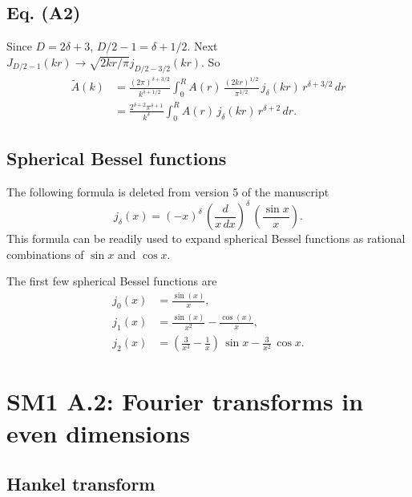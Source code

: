 \documentclass[preprint]{revtex4-1}
\numberwithin{equation}{subsection}
\numberwithin{table}{section}
\begin{document}
\subsection{Eq. (A2)}

Since $D = 2\delta + 3$, $D/2 - 1 = \delta + 1/2$.
%
Next $J_{D/2-1}(kr) \rightarrow \sqrt{2 k r/\pi} j_{D/2-3/2} (kr)$.
%
So
\begin{align*}
\tilde A(k)
&=
\frac{ (2 \pi)^{\delta + 3/2} } { k^{\delta + 1/2} }
\int_0^R
  A(r) \, \frac{ (2kr)^{1/2} } { \pi^{1/2} } \,
  j_\delta(k r) \, r^{\delta + 3/2}\, dr \\
&=
  \frac{ 2^{\delta + 2} \pi^{\delta + 1} } { k^\delta }
\int_0^R
  A(r) \, j_\delta(k r) \, r^{\delta + 2} \, dr.
\end{align*}



\subsection{Spherical Bessel functions}

The following formula is deleted from version 5 of the manuscript
\begin{equation}
  j_\delta(x)
=
  (-x)^\delta \,
  \left(
    \frac{ d }
    { x \, dx }
  \right)^\delta
  \,
  \left(
    \frac{ \sin x } { x }
  \right).
\end{equation}
This formula can be readily used to expand
spherical Bessel functions
as rational combinations of $\sin x$ and $\cos x$.

The first few spherical Bessel functions are
\begin{align*}
  j_0(x)
&=
  \frac{ \sin(x) } { x },
\\
  j_1(x)
&=
  \frac{ \sin(x) } { x^2 }
-
  \frac{ \cos(x) } { x },
\\
  j_2(x)
&=
  \left(
    \frac{ 3 } { x^3 }
    -
    \frac{ 1 } { x }
  \right)
  \,
  \sin x
  -
  \frac{ 3 } { x^2 }
  \,
  \cos x.
\end{align*}



\section{SM1 A.2: Fourier transforms in even dimensions}

\subsection{Hankel transform}
\end{document}

